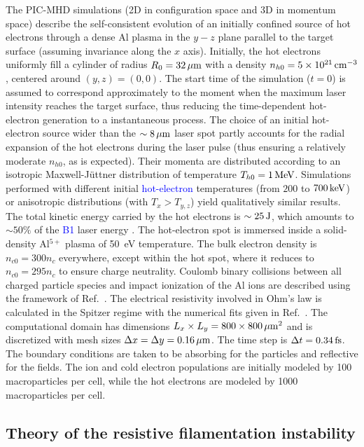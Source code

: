 \documentclass[aps,showpacs,superscriptaddress]{revtex4}
\begin{document}
The PIC-MHD simulations (2D in configuration space and 3D in momentum space) describe the self-consistent evolution of an initially confined source of hot electrons through a dense Al plasma in the $y-z$ plane parallel to the target surface (assuming invariance along the $x$ axis). Initially, the hot electrons uniformly fill a cylinder of radius $R_0=32\,\rm \mu m$ with a density $n_{h0}=5\times 10^{21}\,\rm cm^{-3}$, centered around $(y,z)=(0,0)$. The start time of the simulation ($t=0$) is assumed to correspond approximately to the moment when the maximum laser intensity reaches the target surface, thus reducing the time-dependent hot-electron generation to a instantaneous process. The choice of an initial hot-electron source wider than the $\sim 8\,\rm \mu m$ laser spot partly accounts for the radial expansion of the hot electrons during the laser pulse \cite{PRE_Stephens_2004} (thus ensuring a relatively moderate $n_{h0}$, as is expected). Their momenta are distributed according to an isotropic Maxwell-J\"uttner distribution of temperature $T_{h0}=1\,\rm MeV$. Simulations performed with different initial \textcolor{blue}{hot-electron} temperatures (from $200$ to $700\,\rm keV$) or anisotropic distributions (with $T_x>T_{y,z}$) yield qualitatively similar results. The total kinetic energy carried by the hot electrons is $\sim 25\,\rm J$, which amounts to $\sim 50\%$ of the \textcolor{blue}{B1} laser energy \cite{PRL_Ping_2008}. The hot-electron spot is immersed inside a solid-density Al$^{5+}$ plasma of \mbox{50~eV} temperature. The bulk electron density is $n_{c0}=300n_c$ everywhere, except within the hot spot, where it reduces to $n_{c0}=295n_c$ to ensure charge neutrality. Coulomb binary collisions between all charged particle species and impact ionization of the Al ions are described using the framework of Ref.~\cite{POP_Perez_2012}. The electrical resistivity involved in Ohm's law is calculated in the Spitzer regime with the numerical fits given in Ref.~\cite{Decoster_1998}. 
The computational domain has dimensions $L_x\times L_y=800 \times 800\,\rm \mu m^2$ and is discretized with mesh sizes $\Delta x=\Delta y =0.16\,\rm \mu m$. The time step is $\Delta t=0.34\,\rm fs$. The boundary conditions are taken to be absorbing for the particles and reflective for the fields. The ion and cold electron populations are initially modeled by 100 macroparticles per cell, while the hot electrons are modeled by 1000 macroparticles per cell. 

\subsection*{Theory of the resistive filamentation instability}
\end{document}
